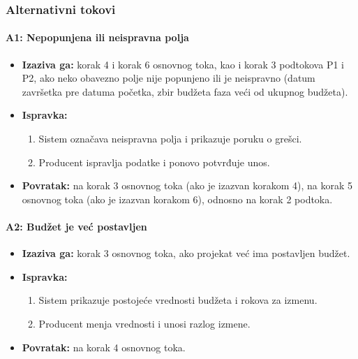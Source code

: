 \subsubsection*{Alternativni tokovi}

\paragraph*{A1: Nepopunjena ili neispravna polja}
\begin{itemize}
    \item \textbf{Izaziva ga:} korak 4 i korak 6 osnovnog toka, kao i korak 3 podtokova P1 i P2, ako neko obavezno polje nije popunjeno ili je neispravno (datum završetka pre datuma početka, zbir budžeta faza veći od ukupnog budžeta).
    \item \textbf{Ispravka:}
    \begin{enumerate}
        \item Sistem označava neispravna polja i prikazuje poruku o grešci.
        \item Producent ispravlja podatke i ponovo potvrđuje unos.
    \end{enumerate}
    \item \textbf{Povratak:} na korak 3 osnovnog toka (ako je izazvan korakom 4), na korak 5 osnovnog toka (ako je izazvan korakom 6), odnosno na korak 2 podtoka.
\end{itemize}

\paragraph*{A2: Budžet je već postavljen}
\begin{itemize}
    \item \textbf{Izaziva ga:} korak 3 osnovnog toka, ako projekat već ima postavljen budžet.
    \item \textbf{Ispravka:}
    \begin{enumerate}
        \item Sistem prikazuje postojeće vrednosti budžeta i rokova za izmenu.
        \item Producent menja vrednosti i unosi razlog izmene.
    \end{enumerate}
    \item \textbf{Povratak:} na korak 4 osnovnog toka.
\end{itemize}

